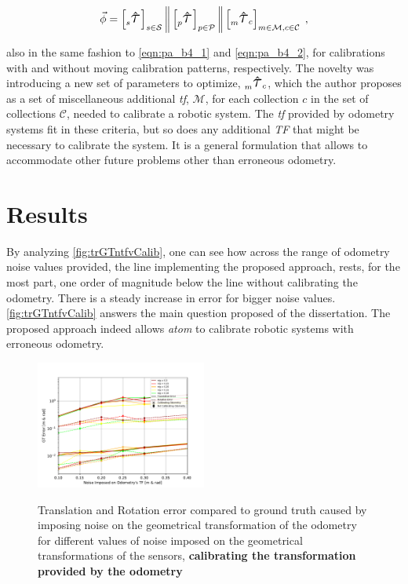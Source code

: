 \documentclass{ieeeaccess}
\newcommand{\Tau}{\scalebox{1.60}{$\tau$}}
\newcommand{\optParam}[2]{\prescript{}{#1}{\mathbf{\hat{\Tau}}_{#2}}}
\begin{document}
\begin{equation}
  \label{eqn:pa_b4_4}
\vec{\phi} = \left[ \optParam{s}{} \right]_{s \in \mathcal{S}} \bigg\Vert
                      \left[ \optParam{p}{} \right]_{p \in \mathcal{P}} \bigg\Vert
                      \left[ \optParam{m}{c} \right]_{m \in \mathcal{M}, c \in \mathcal{C}} \; ,
\end{equation}

\noindent also in the same fashion to \autoref{eqn:pa_b4_1} and \autoref{eqn:pa_b4_2}, for calibrations with
and without moving calibration patterns, respectively. The novelty was introducing a new set of parameters to
optimize, $\optParam{m}{c}$, which the author proposes as a set of miscellaneous additional \textit{tf},
$\mathcal{M}$, for each collection $c$ in the set of collections $\mathcal{C}$, needed to calibrate a robotic
system. The \textit{tf} provided by odometry systems fit in these criteria, but so does any additional \textit{TF}
that might be necessary to calibrate the system. It is a general formulation that allows to accommodate other
future problems other than erroneous odometry.


\section{Results}

By analyzing \autoref{fig:trGTntfvCalib}, one can see how across the range of odometry noise values
provided, the line implementing the proposed approach, rests, for the most part, one order of magnitude below the line
without calibrating the odometry. There is a steady increase in error for bigger noise values.
\autoref{fig:trGTntfvCalib} answers the main question proposed of the dissertation. The proposed approach
indeed allows \textit{atom} to calibrate robotic systems with erroneous odometry.

    \begin{figure}[h]
      \centering
      \includegraphics[width=0.5\textwidth]{resources/Translation_&_Rotation_error_compared_to_GT_caused_by_imposing_noise_on_the_odometry_calibrating_odometry_OVERLAPPED.pdf} \\
      \caption{\label{fig:trGTntfvCalib}Translation and Rotation error compared to ground truth caused by imposing noise on the
      geometrical transformation of the odometry for different values of noise imposed on the geometrical
    transformations of the sensors, \textbf{calibrating the transformation provided by the  odometry}}
    \end{figure}
\end{document}
